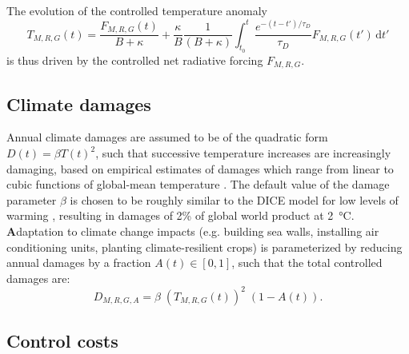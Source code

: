 \documentclass{article}
\begin{document}
The evolution of the controlled temperature anomaly
\begin{equation}
    T_{M,R,G}(t) = \frac{F_{M,R,G}(t)}{B + \kappa} + \frac{\kappa}{B} \frac{1}{(B+\kappa)} \int_{t_{0}}^{t} \frac{ e^{-(t-t')/\tau_{D}}}{\tau_{D}} F_{M,R,G}(t') \, \text{d}t'\label{eq.temperature}
\end{equation}
is thus driven by the controlled net radiative forcing $F_{M,R,G}$.

\subsection{Climate damages}

Annual climate damages are assumed to be of the quadratic form $D(t) = \beta T(t)^{2}$, such that successive temperature increases are increasingly damaging, based on empirical estimates of damages which range from linear to cubic functions of global-mean temperature \citep{stern_economics_2007}. The default value of the damage parameter $\beta$ is chosen to be roughly similar to the DICE model for low levels of warming \citep{nordhaus2013dice}, resulting in damages of 2\% of global world product at \SI{2}{\celsius}. \textbf{A}daptation to climate change impacts (e.g. building sea walls, installing air conditioning units, planting climate-resilient crops) is parameterized by reducing annual damages by a fraction $A(t) \in [0,1]$, such that the total controlled damages are:
\begin{equation}
    D_{M, R, G, A} = \beta \; (T_{M, R, G}(t))^{2} \; (1-A(t)).
\end{equation}

\subsection{Control costs}
\end{document}
